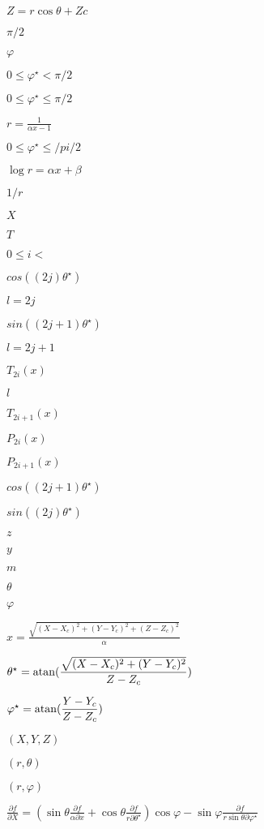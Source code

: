 \documentclass{article}
\begin{document}
$ Z = r \cos\theta + Zc $
\pagebreak

$ \pi/2$
\pagebreak

$\varphi $
\pagebreak

$ 0 \leq \varphi^\star < \pi /2 $
\pagebreak

$ 0 \leq \varphi^\star \leq \pi/2 $
\pagebreak

$ r = \displaystyle\frac{1}{\alpha x -1}$
\pagebreak

$ 0 \leq \varphi^\star \leq /pi /2 $
\pagebreak

$ \log r = \alpha x + \beta $
\pagebreak

$ 1/r $
\pagebreak

$ X $
\pagebreak

$ T $
\pagebreak

$ 0 \leq i < $
\pagebreak

$ cos((2j)\theta^\star)$
\pagebreak

$ l = 2j $
\pagebreak

$ sin((2j+1) \theta^\star)$
\pagebreak

$ l = 2j+1 $
\pagebreak

$ T_{2i} (x)$
\pagebreak

$ l $
\pagebreak

$ T_{2i+1} (x)$
\pagebreak

$ P_{2i} (x)$
\pagebreak

$ P_{2i+1} (x)$
\pagebreak

$ cos((2j+1)\theta^\star)$
\pagebreak

$ sin((2j) \theta^\star)$
\pagebreak

$z$
\pagebreak

$y$
\pagebreak

$ m$
\pagebreak

$ \theta$
\pagebreak

$ \varphi$
\pagebreak

$ x = \displaystyle\frac{\sqrt{(X-X_c)^2+(Y-Y_c)^2+(Z-Z_c)^2}}{\alpha} $
\pagebreak

$ \theta^\star = {\rm atan} (\displaystyle\frac{\sqrt{(X-X_c)^2+(Y-Y_c)^2}}{Z-Z_c}) $
\pagebreak

$ \varphi^\star = {\rm atan} (\displaystyle\frac{Y-Y_c}{Z-Z_c}) $
\pagebreak

$ (X, Y, Z) $
\pagebreak

$(r, \theta)$
\pagebreak

$(r, \varphi)$
\pagebreak

$ \displaystyle\frac{\partial f}{\partial X} = (\sin\theta \displaystyle\frac{\partial f}{\alpha\partial x} + \cos\theta \displaystyle\frac{\partial f}{r\partial \theta^\star}) \cos\varphi - \sin\varphi \displaystyle\frac{\partial f}{r\sin\theta \partial \varphi^\star} $
\pagebreak
\end{document}
